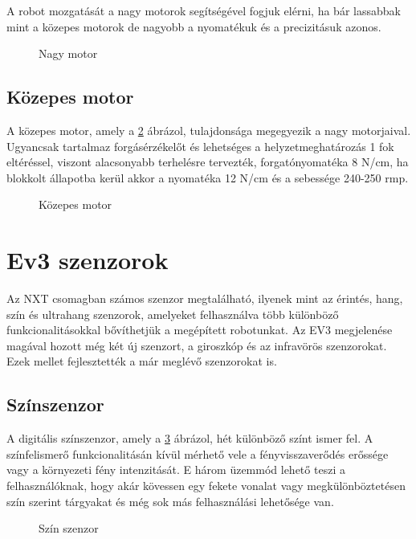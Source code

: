A robot mozgatását a nagy motorok segítségével fogjuk elérni, ha bár lassabbak mint a közepes motorok de nagyobb a nyomatékuk és a precizitásuk azonos.

\begin{figure}[!htb]
	\label{fig:lMotor}
	\centering
	\caption{Nagy motor}
\end{figure}

\subsection{Közepes motor}
A közepes motor, amely a \ref{fig:mMotor} ábrázol, tulajdonsága megegyezik a nagy motorjaival. Ugyancsak tartalmaz forgásérzékelőt és lehetséges a helyzetmeghatározás 1 fok eltéréssel, viszont alacsonyabb terhelésre tervezték, forgatónyomatéka 8 N/cm, ha blokkolt állapotba kerül akkor a nyomatéka 12 N/cm és a sebessége 240-250 rmp.

\begin{figure}[!htb]
	\label{fig:mMotor}
	\centering
	\caption{Közepes motor}
\end{figure}

\section{Ev3 szenzorok}\label{sec:ROBOT:szenzorok}

Az NXT csomagban számos szenzor megtalálható, ilyenek mint az érintés, hang, szín és ultrahang szenzorok, amelyeket felhasználva több különböző funkcionalitásokkal bővíthetjük a megépített robotunkat. Az EV3 megjelenése magával hozott még két új szenzort, a giroszkóp és az infravörös szenzorokat. Ezek mellet fejlesztették a már meglévő szenzorokat is.

\subsection{Színszenzor}

A digitális színszenzor, amely a \ref{fig:colorSensor} ábrázol, hét különböző színt ismer fel. A színfelismerő funkcionalitásán kívül mérhető vele a fényvisszaverődés erőssége vagy a környezeti fény intenzitását. E három üzemmód lehető teszi a felhasználóknak, hogy akár kövessen egy fekete vonalat vagy megkülönböztetésen szín szerint tárgyakat és még sok más felhasználási lehetősége van.

\begin{figure}[!htb]
	\label{fig:colorSensor}
	\centering
	\caption{Szín szenzor}
\end{figure}

